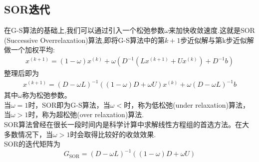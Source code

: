 \documentclass[12pt,a4paper]{article}
\begin{document}
\subsection{SOR迭代}
在G-S算法的基础上,我们可以通过引入一个松弛参数$\omega$来加快收敛速度.这就是SOR (Successive Overrelaxation)算法,即将G-S算法中的第$k+1$步近似解与第k步近似解做一个加权平均:
\begin{align}
x^{(k+1)}=(1-\omega) x^{(k)}+\omega\left(D^{-1}\left(L x^{(k+1)}+U x^{(k)}\right)+D^{-1} b\right)\tag{6.10}
\end{align}
整理后即为
\begin{align}
x^{(k+1)}=(D-\omega L)^{-1}((1-\omega) D+\omega U) x^{(k)}+\omega(D-\omega L)^{-1} b\tag{6.11}
\end{align}
其中$\omega$称为{\color{blue}松弛参数}。\\
当$\omega=1$时，SOR即为G-S算法，当$\omega<$时，称为{\color{blue}低松弛(under relaxation)}算法，当$\omega>1$时，称为{\color{blue}超松弛(over relaxation)}算法.\\
SOR算法曾经在很长一段时间内是科学计算中求解线性方程组的首选方法。在大多数情况下，当$\omega>1$时会取得比较好的收敛效果.\\
SOR的迭代矩阵为
$$
G_{\mathrm{SOR}}=(D-\omega L)^{-1}((1-\omega) D+\omega U)
$$
\end{document}
